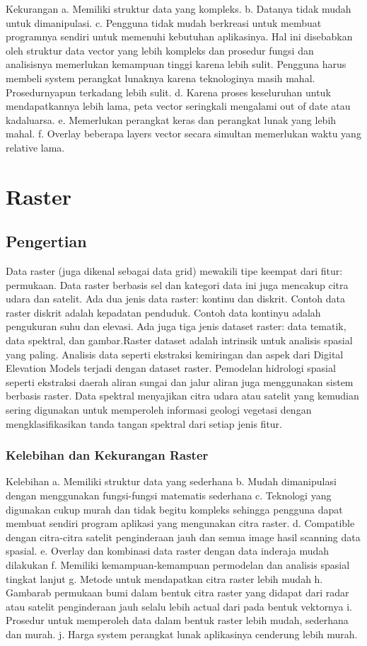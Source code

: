  Kekurangan
 a. Memiliki struktur data yang kompleks.
 b. Datanya tidak mudah untuk dimanipulasi.
 c. Pengguna tidak mudah berkreasi untuk membuat programnya sendiri untuk memenuhi kebutuhan aplikasinya. 
    Hal ini disebabkan oleh struktur data vector yang lebih kompleks dan prosedur fungsi dan analisisnya 
    memerlukan kemampuan tinggi karena lebih sulit. 
    Pengguna harus membeli system perangkat lunaknya karena teknologinya masih mahal. Prosedurnyapun terkadang lebih sulit.
 d. Karena proses keseluruhan untuk mendapatkannya lebih lama, peta vector seringkali mengalami out of date atau kadaluarsa.
 e. Memerlukan perangkat keras dan perangkat lunak yang lebih mahal.
 f. Overlay beberapa layers vector secara simultan memerlukan waktu yang relative lama.
 
 \section{Raster}
 \subsection{Pengertian}
Data raster (juga dikenal sebagai data grid) mewakili tipe keempat dari fitur: permukaan. 
Data raster berbasis sel dan kategori data ini juga mencakup citra udara dan satelit. 
Ada dua jenis data raster: kontinu dan diskrit. Contoh data raster diskrit adalah kepadatan penduduk. 
Contoh data kontinyu adalah pengukuran suhu dan elevasi. Ada juga tiga jenis dataset raster: data tematik, 
data spektral, dan gambar.Raster dataset adalah intrinsik untuk analisis spasial yang paling. 
Analisis data seperti ekstraksi kemiringan dan aspek dari Digital Elevation Models terjadi dengan dataset raster.
Pemodelan hidrologi spasial seperti ekstraksi daerah aliran sungai dan jalur aliran juga menggunakan sistem berbasis raster.
Data spektral menyajikan citra udara atau satelit yang kemudian sering digunakan untuk memperoleh informasi geologi vegetasi dengan mengklasifikasikan tanda tangan spektral dari setiap jenis fitur.

\subsubsection{Kelebihan dan Kekurangan Raster}
 Kelebihan
 a. Memiliki struktur data yang sederhana
 b. Mudah dimanipulasi dengan menggunakan fungsi-fungsi matematis sederhana
 c. Teknologi yang digunakan cukup murah dan tidak begitu kompleks sehingga pengguna dapat 
    membuat sendiri program aplikasi yang mengunakan citra raster.
 d. Compatible dengan citra-citra satelit penginderaan jauh dan semua image hasil scanning data spasial.
 e. Overlay dan kombinasi data raster dengan data inderaja mudah dilakukan
 f. Memiliki kemampuan-kemampuan permodelan dan analisis spasial tingkat lanjut
 g. Metode untuk mendapatkan citra raster lebih mudah
 h. Gambarab permukaan bumi dalam bentuk citra raster yang didapat dari radar atau satelit penginderaan jauh selalu lebih actual dari       pada bentuk vektornya
 i. Prosedur untuk memperoleh data dalam bentuk raster lebih mudah, sederhana dan murah.
 j. Harga system perangkat lunak aplikasinya cenderung lebih murah.
 
